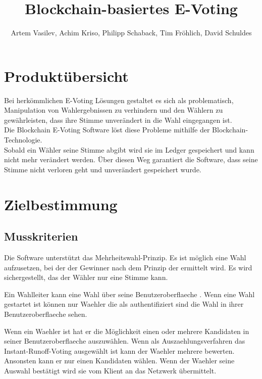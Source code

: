 \documentclass[parskip=full,11pt,twoside]{scrartcl}
\title{Blockchain-basiertes E-Voting}
\author{Artem Vasilev, Achim Kriso, Philipp Schaback, Tim Fröhlich, David Schuldes}
\begin{document}
\maketitle

\pagebreak

\tableofcontents
\pagebreak
\section{Produktübersicht}

Bei herkömmlichen E-Voting Lösungen gestaltet es sich als problematisch, Manipulation von Wahlergebnissen zu verhindern und den Wählern zu gewährleisten, dass ihre Stimme unverändert in die Wahl eingegangen ist. \\
Die Blockchain E-Voting Software löst diese Probleme mithilfe der Blockchain-Technologie. \\
Sobald ein Wähler seine Stimme abgibt wird sie im \gls{Ledger} gespeichert und kann nicht mehr verändert werden. Über diesen Weg garantiert die Software, dass seine Stimme nicht verloren geht und unverändert gespeichert wurde.

\section{Zielbestimmung}

\subsection{Musskriterien}

Die Software unterstützt das Mehrheitswahl-Prinzip. Es ist möglich eine Wahl aufzusetzen, bei der der Gewinner nach dem Prinzip der 
 ermittelt wird. 
Es wird sichergestellt, das der Wähler nur eine Stimme  kann.

Ein \gls{Wahlleiter} kann eine \gls{Wahl} über seine \gls{Benutzeroberflaeche} .
Wenn eine \gls{Wahl} gestartet ist können nur \gls{Waehler} die als  authentifiziert sind die \gls{Wahl} in ihrer \gls{Benutzeroberflaeche} sehen.

Wenn ein \gls{Waehler}  ist hat er die Möglichkeit einen oder mehrere Kandidaten in seiner \gls{Benutzeroberflaeche} auszuwählen. Wenn als \gls{Auszaehlungsverfahren} das \gls{Instant-Runoff-Voting} ausgewählt ist kann der \gls{Waehler} mehrere  bewerten. Ansonsten kann er nur einen Kandidaten wählen.
Wenn der \gls{Waehler} seine Auswahl bestätigt wird sie vom \gls{Klient} an das Netzwerk übermittelt.
\end{document}
